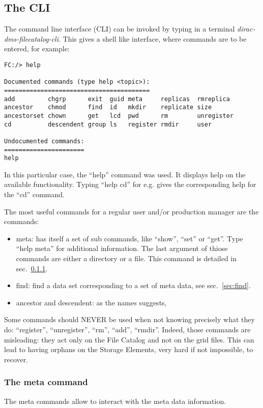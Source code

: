 \documentclass[a4paper,12pt]{article}
\begin{document}
\subsection{The CLI}
The command line interface (CLI) can be invoked by typing in a terminal
\emph{dirac-dms-filecatalog-cli}. This gives a shell like interface, where
commands are to be entered, for example:
\begin{lstlisting}
FC:/> help

Documented commands (type help <topic>):
========================================
add         chgrp      exit  guid meta     replicas  rmreplica 
ancestor    chmod      find  id   mkdir    replicate size      
ancestorset chown      get   lcd  pwd      rm        unregister
cd          descendent group ls   register rmdir     user      

Undocumented commands:
======================
help
\end{lstlisting}
In this particular case, the ``help'' command was used. It displays help on the
available functionality. Typing ``help cd'' for e.g. gives the corresponding
help for the ``cd'' command.

The most useful commands for a regular user and/or production manager are the
commands:
\begin{itemize}
  \item meta: has itself a set of sub commands, like ``show'', ``set'' or
  ``get''. Type ``help meta'' for additional information. The last argument of
  thiose commands are either a directory or a file. This command is detailed in
  sec.~\ref{sec:meta}.
  \item find: find a data set corresponding to a set of meta data, see
  sec.~\ref{sec:find}.
  \item ancestor and descendent: as the names suggests,
\end{itemize}

Some commands should {\color{red} NEVER} be used when not knowing precisely
what they do: ``register'', ``unregister'', ``rm'', ``add'', ``rmdir''. Indeed, 
those commands are misleading: they act only on the File Catalog and not on the
grid files. This can lead to having orphans on the Storage Elements, very hard if not
impossible, to recover.

\subsubsection{The meta command}\label{sec:meta}
The meta commands allow to interact with the meta data information. 
\end{document}
